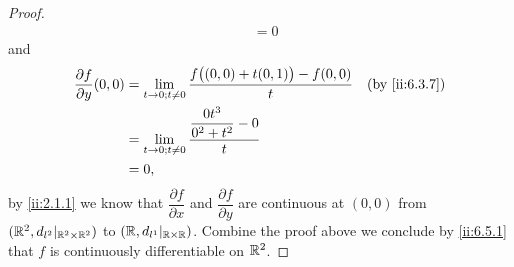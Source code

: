 \begin{proof}
\begin{align*}
                                         & = 0
  \end{align*}
  and
  \begin{align*}
    \dfrac{\partial f}{\partial y}(0, 0) & = \lim_{t \to 0 ; t \neq 0} \dfrac{f\big((0, 0) + t(0, 1)\big) - f(0, 0)}{t} &  & \by{ii:6.3.7} \\
                                         & = \lim_{t \to 0 ; t \neq 0} \dfrac{\dfrac{0 t^3}{0^2 + t^2} - 0}{t}                             \\
                                         & = 0,
  \end{align*}
  by \cref{ii:2.1.1} we know that \(\dfrac{\partial f}{\partial x}\) and \(\dfrac{\partial f}{\partial y}\) are continuous at \((0, 0)\) from \((\mathbb{R}^2, d_{l^2}|_{\mathbb{R}^2 \times \mathbb{R}^2})\) to \((\mathbb{R}, d_{l^1}|_{\mathbb{R} \times \mathbb{R}})\).
  Combine the proof above we conclude by \cref{ii:6.5.1} that \(f\) is continuously differentiable on \(\mathbb{R}^2\).


\end{proof}
